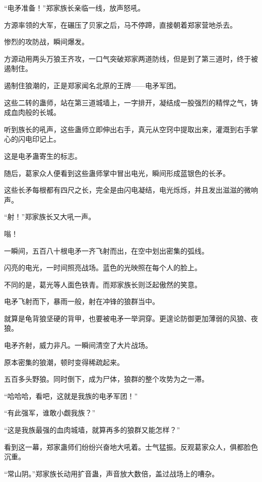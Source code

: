 
\begin{this_body}



“电矛准备！”郑家族长亲临一线，放声怒吼。

方源率领的大军，在碾压了贝家之后，马不停蹄，直接朝着郑家营地杀去。

惨烈的攻防战，瞬间爆发。

方源动用两头万狼王齐攻，一口气突破郑家两道防线，但是到了第三道时，终于被遏制住。

遏制住狼潮的，正是郑家闻名北原的王牌——电矛军团。

这些二转的蛊师，站在第三道城墙上，一字排开，凝结成一股强烈的精悍之气，铸成血肉般的长城。

听到族长的吼声，这些蛊师立即伸出右手，真元从空窍中提取出来，灌溉到右手掌心的闪电印记上。

这是电矛蛊寄生的标志。

随后，葛家众人便看到这些蛊师掌中冒出电光，瞬间形成蓝银色的长矛。

这些长矛每根都有四尺之长，完全是由闪电凝结，电光烁烁，并且发出滋滋的微响声。

“射！”郑家族长又大吼一声。

嗡！

一瞬间，五百八十根电矛一齐飞射而出，在空中划出密集的弧线。

闪亮的电光，一时间照亮战场。蓝色的光映照在每个人的脸上。

不同的是，葛光等人面色铁青。而郑家族长则泛起傲然的笑意。

电矛飞射而下，暴雨一般，射在冲锋的狼群当中。

就算是龟背狼坚硬的背甲，也要被电矛一举洞穿。更遑论防御更加薄弱的风狼、夜狼。

电矛齐射，威力非凡。一瞬间清空了大片战场。

原本密集的狼潮，顿时变得稀疏起来。

五百多头野狼。同时倒下，成为尸体，狼群的整个攻势为之一滞。

“哈哈哈，看吧，这就是我族的电矛军团！”

“有此强军，谁敢小觑我族？”

“这是我族最强的血肉城墙，就算再多的狼群又能怎样？”

看到这一幕，郑家蛊师们纷纷兴奋地大吼着。士气猛振。反观葛家众人，俱都脸色沉重。

“常山阴。”郑家族长动用扩音蛊，声音放大数倍，盖过战场上的嘈杂。


\end{this_body}
